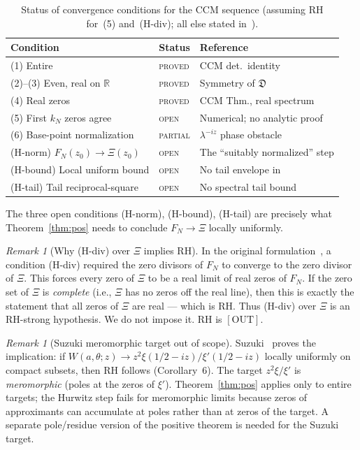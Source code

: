 \documentclass[12pt]{amsart}
\theoremstyle{definition}
\theoremstyle{remark}
\newtheorem{remark}[definition]{Remark}
\theoremstyle{plain}
\newcommand{\RR}{\mathbb{R}}
\begin{document}
\begin{table}[h]
\centering
\caption{Status of convergence conditions for the CCM sequence
  (assuming RH for~(5) and~(H-div); all else stated in~\cite{CCM2025}).}
\label{tab:ccm}
\begin{tabular}{lll}
\hline
Condition & Status & Reference \\
\hline
(1) Entire & \textsc{proved} & CCM det.\ identity \\
(2)--(3) Even, real on $\RR$ & \textsc{proved} & Symmetry of $\mathfrak{D}$ \\
(4) Real zeros & \textsc{proved} & CCM Thm., real spectrum \\
(5) First $k_N$ zeros agree & \textsc{open} & Numerical; no analytic proof \\
(6) Base-point normalization & \textsc{partial} & $\lambda^{-iz}$ phase obstacle \\
(H-norm) $F_N(z_0)\to\Xi(z_0)$ & \textsc{open} & The ``suitably normalized'' step \\
(H-bound) Local uniform bound & \textsc{open} & No tail envelope in~\cite{CCM2025} \\
(H-tail) Tail reciprocal-square & \textsc{open} & No spectral tail bound \\
\hline
\end{tabular}
\end{table}

The three open conditions (H-norm), (H-bound), (H-tail) are precisely
what Theorem~\ref{thm:pos} needs to conclude $F_N\to\Xi$ locally uniformly.

\begin{remark}[Why (H-div) over $\Xi$ implies RH]
\label{rem:hdiv-rh}
In the original formulation~\cite{CCM2025}, a condition (H-div) required
the zero divisors of $F_N$ to converge to the zero divisor of $\Xi$.
This forces every zero of $\Xi$ to be a real limit of real zeros of $F_N$.
If the zero set of $\Xi$ is \emph{complete} (i.e., $\Xi$ has no zeros off
the real line), then this is exactly the statement that all zeros of $\Xi$
are real --- which is RH.  Thus (H-div) over $\Xi$ is an RH-strong hypothesis.
We do not impose it.  RH is $[\mathrm{OUT}]$.
\end{remark}

\begin{remark}[Suzuki meromorphic target out of scope]
\label{rem:suzuki}
Suzuki~\cite{Suzuki2026} proves the implication: if $W(a,\theta;z)\to
z^2\xi(1/2-iz)/\xi'(1/2-iz)$ locally uniformly on compact subsets, then RH
follows (Corollary~6).  The target $z^2\xi/\xi'$ is \emph{meromorphic} (poles
at the zeros of $\xi'$).  Theorem~\ref{thm:pos} applies only to entire targets;
the Hurwitz step fails for meromorphic limits because zeros of approximants
can accumulate at poles rather than at zeros of the target.  A separate
pole/residue version of the positive theorem is needed for the Suzuki target.
\end{remark}
\end{document}

